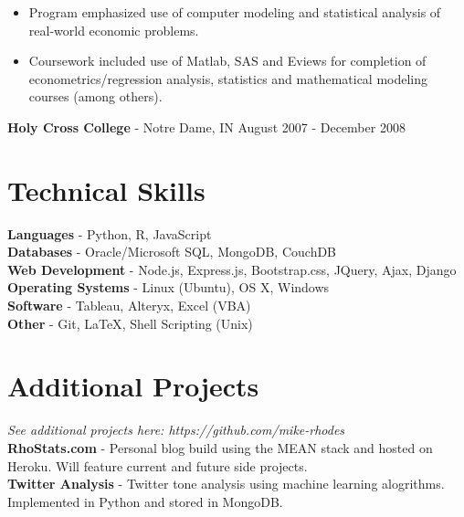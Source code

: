 \documentclass[margin]{res}
\begin{document}
\begin{resume}
\begin{itemize} \itemsep -2pt  %
	\item Program emphasized use of computer modeling and statistical analysis of real-world economic problems.
 	\item Coursework included use of Matlab, SAS and Eviews for completion of econometrics/regression analysis, statistics and mathematical modeling courses (among others).
\end{itemize}

\textbf{Holy Cross College} - Notre Dame, IN \hfill August 2007 - December 2008

 
\section{Technical Skills}
    {\bf Languages} - Python, R, JavaScript\\
	{\bf Databases} - Oracle/Microsoft SQL, MongoDB, CouchDB\\
	{\bf Web Development} - Node.js, Express.js, Bootstrap.css, JQuery, Ajax, Django\\
	{\bf Operating Systems} - Linux (Ubuntu), OS X, Windows\\
    {\bf Software} - Tableau, Alteryx, Excel (VBA)\\
    {\bf Other} - Git, {\LaTeX}, Shell Scripting (Unix)
    
\section{Additional Projects} \hfill \textit{See additional projects here: https://github.com/mike-rhodes}\\
	{\bf RhoStats.com} - Personal blog build using the MEAN stack and hosted on Heroku. Will feature current and future side projects.\\
	{\bf Twitter Analysis} - Twitter tone analysis using machine learning alogrithms. Implemented in Python and stored in MongoDB.
	
\end{resume}
\end{document}

